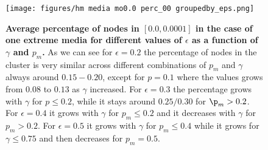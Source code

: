 \documentclass[10pt,letterpaper]{article}
\begin{document}
\begin{figure}
    \centering
    \texttt{[image: figures/hm media mo0.0 perc\_00 groupedby\_eps.png]}
    \caption{\textbf{Average percentage of nodes in $[0.0, 0.0001]$ in the case of one extreme media for different values of $\epsilon$ as a function of $\gamma$ and $p_m$.} As we can see for $\epsilon = 0.2$ the percentage of nodes in the  cluster is very similar across different combinations of $p_m$ and $\gamma$ always around $0.15-0.20$, except for $p=0.1$ where the values grows from $0.08 $ to $0.13$ as $\gamma$ increased. For $\epsilon =0.3$ the percentage grows with $\gamma$ for $p \leq 0.2$, while it stays around $0.25/0.30$ for $\p_m > 0.2$. For $\epsilon = 0.4$ it grows with $\gamma$ for $p_m \leq 0.2$ and it decreases with $\gamma$ for $p_m > 0.2$. For $\epsilon = 0.5$ it grows with $\gamma$ for $p_m \leq 0.4$ while it grows for $\gamma \leq 0.75$ and then decreases for $p_m=0.5$.}
    \label{fig:00avgextremeperc}
\end{figure}
\end{document}
